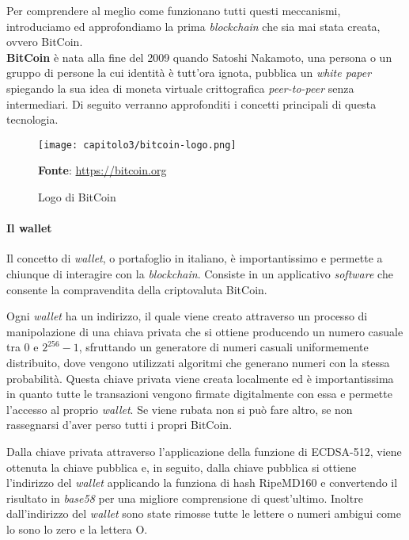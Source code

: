 Per comprendere al meglio come funzionano tutti questi meccanismi, introduciamo ed approfondiamo la prima \textit{blockchain} che sia mai stata creata, ovvero BitCoin. \\

\textbf{BitCoin} è nata alla fine del 2009 quando Satoshi Nakamoto, una persona o un gruppo di persone la cui identità è tutt'ora ignota, pubblica un \textit{white paper} spiegando la sua idea di moneta virtuale crittografica \textit{peer-to-peer} senza intermediari. Di seguito verranno approfonditi i concetti principali di questa tecnologia.

\begin{figure}[h!]
  \centering
  \texttt{[image: capitolo3/bitcoin-logo.png]}
  \caption{Logo di BitCoin}
  \textbf{Fonte}: \href{https://bitcoin.org/it/}{https://bitcoin.org}
\end{figure}

\paragraph{Il wallet}
Il concetto di \textit{wallet}, o portafoglio in italiano, è importantissimo e permette a chiunque di interagire con la \textit{blockchain}. Consiste in un applicativo \textit{software} che consente la compravendita della criptovaluta BitCoin.


Ogni \textit{wallet} ha un indirizzo, il quale viene creato attraverso un processo di manipolazione di una chiava privata che si ottiene producendo un numero casuale tra \( 0 \) e \( 2^{256}-1 \), sfruttando un generatore di numeri casuali uniformemente distribuito, dove vengono utilizzati algoritmi che generano numeri con la stessa probabilità. Questa chiave privata viene creata localmente ed è importantissima in quanto tutte le transazioni vengono firmate digitalmente con essa e permette l'accesso al proprio \textit{wallet}. Se viene rubata non si può fare altro, se non rassegnarsi d'aver perso tutti i propri BitCoin.

Dalla chiave privata attraverso l'applicazione della funzione di ECDSA-512, viene ottenuta la chiave pubblica e, in seguito, dalla chiave pubblica si ottiene l'indirizzo del \textit{wallet} applicando la funziona di hash RipeMD160 e convertendo il risultato in \textit{base58} per una migliore comprensione di quest'ultimo. Inoltre dall'indirizzo del \textit{wallet} sono state rimosse tutte le lettere o numeri ambigui come lo sono lo zero e la lettera O.

